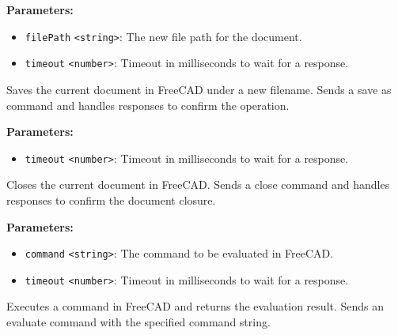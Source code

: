 \documentclass[12pt,a4paper]{article}
\begin{document}
\vspace{5mm}
\noindent {}


\noindent \textbf{Parameters:}
\begin{itemize}
  \item \texttt{filePath} \texttt{<string>}: The new file path for the document.
  \item \texttt{timeout} \texttt{<number>}: Timeout in milliseconds to wait for a response.
\end{itemize}

\noindent Saves the current document in FreeCAD under a new filename.
Sends a save as command and handles responses to confirm the operation.

\vspace{5mm}
\noindent {}


\noindent \textbf{Parameters:}
\begin{itemize}
  \item \texttt{timeout} \texttt{<number>}: Timeout in milliseconds to wait for a response.
\end{itemize}

\noindent Closes the current document in FreeCAD.
Sends a close command and handles responses to confirm the document closure.

\vspace{5mm}
\noindent {}


\noindent \textbf{Parameters:}
\begin{itemize}
  \item \texttt{command} \texttt{<string>}: The command to be evaluated in FreeCAD.
  \item \texttt{timeout} \texttt{<number>}: Timeout in milliseconds to wait for a response.
\end{itemize}

\noindent Executes a command in FreeCAD and returns the evaluation result.
Sends an evaluate command with the specified command string.

\vspace{5mm}
\noindent {}
\end{document}
